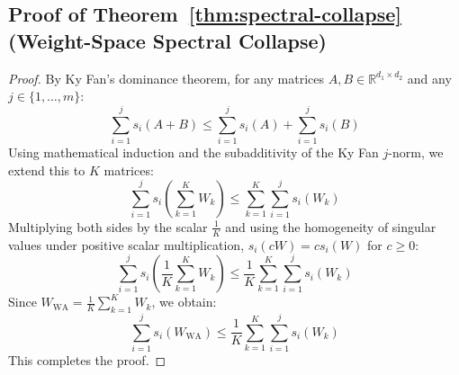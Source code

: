 \documentclass{article}
\theoremstyle{plain}
\theoremstyle{definition}
\theoremstyle{remark}
\begin{document}
\subsection{Proof of Theorem~\ref{thm:spectral-collapse} (Weight-Space Spectral Collapse)}
\label{appendix:spectral-collapse-proof}
\begin{proof}
By Ky Fan's dominance theorem, for any matrices $A, B \in \mathbb{R}^{d_1 \times d_2}$ and any $j \in \{1, \dots, m\}$:
\begin{equation}
    \sum_{i=1}^j s_i(A + B) \le \sum_{i=1}^j s_i(A) + \sum_{i=1}^j s_i(B)
\end{equation}
Using mathematical induction and the subadditivity of the Ky Fan $j$-norm, we extend this to $K$ matrices:
\begin{equation}
    \sum_{i=1}^j s_i\left(\sum_{k=1}^K W_k\right) \le \sum_{k=1}^K \sum_{i=1}^j s_i(W_k)
\end{equation}
Multiplying both sides by the scalar $\frac{1}{K}$ and using the homogeneity of singular values under positive scalar multiplication, $s_i(c W) = c s_i(W)$ for $c \ge 0$:
\begin{equation}
    \sum_{i=1}^j s_i\left(\frac{1}{K}\sum_{k=1}^K W_k\right) \le \frac{1}{K} \sum_{k=1}^K \sum_{i=1}^j s_i(W_k)
\end{equation}
Since $W_{\text{WA}} = \frac{1}{K}\sum_{k=1}^K W_k$, we obtain:
\begin{equation}
    \sum_{i=1}^j s_i(W_{\text{WA}}) \le \frac{1}{K} \sum_{k=1}^K \sum_{i=1}^j s_i(W_k)
\end{equation}
This completes the proof.
\end{proof}
\end{document}
